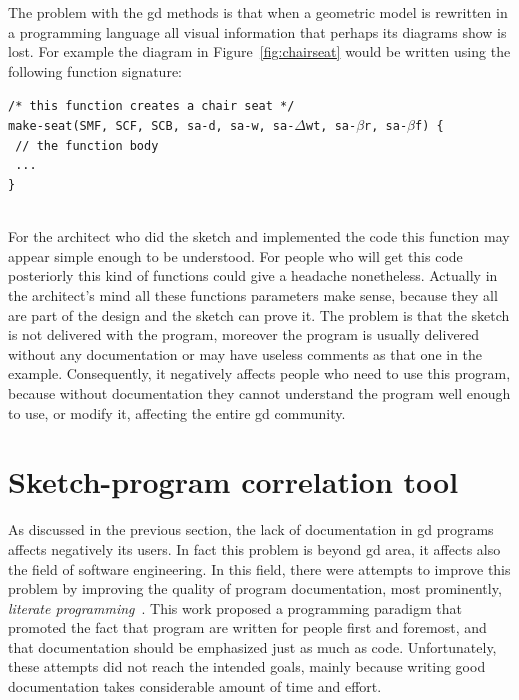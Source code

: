 The problem with the \gls{gd} methods is that when a geometric model is rewritten in a programming language all visual information that perhaps its diagrams show is lost. For example the diagram in Figure~\ref{fig:chairseat} would be written using the following function signature: \\

\begin{minipage}[c]{.8\textwidth}
\texttt{/* this function creates a chair seat */} \\
\texttt{make-seat(SMF, SCF, SCB, sa-d, sa-w, sa-$\Delta$wt, sa-$\beta$r, sa-$\beta$f) \{} \\
\texttt{\hphantom{...} // the function body} \\
\qquad \texttt{\hphantom{...} ...} \\
\texttt{\}}
\end{minipage} \\

For the architect who did the sketch and implemented the code this function may appear simple enough to be understood. For people who will get this code posteriorly this kind of functions could give a headache nonetheless. Actually in the architect's mind all these functions parameters make sense, because they all are part of the design and the sketch can prove it. The problem is that the sketch is not delivered with the program, moreover the program is usually delivered without any documentation or may have useless comments as that one in the example. Consequently, it negatively affects people who need to use this program, because without documentation they cannot understand the program well enough to use, or modify it, affecting the entire \gls{gd} community. 

\section{Sketch-program correlation tool}

As discussed in the previous section, the lack of documentation in \gls{gd} programs affects negatively its users. In fact this problem is beyond \gls{gd} area, it affects also the field of software engineering. In this field, there were attempts to improve this problem by improving the quality of program documentation, most prominently, \textit{literate programming}~\citep{knuth1984literate}. This work proposed a programming paradigm that promoted the fact that program are written for people first and foremost, and that documentation should be emphasized just as much as code. Unfortunately, these attempts did not reach the intended goals, mainly because writing good documentation takes considerable amount of time and effort.

